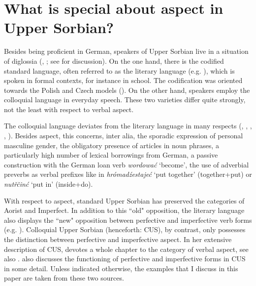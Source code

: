 \documentclass[output=paper,colorlinks,citecolor=brown]{langscibook}
\begin{document}
\section{What is special about aspect in Upper Sorbian?}\label{mueller:sec:cus}

Besides being proficient in German, speakers of Upper Sorbian live in a situation of diglossia (\citealt{Breu2000}, \citealt{Lewa2002}; see \citealt[39ff.]{Scholze2008} for discussion). On the one hand, there is the codified standard language, often referred to as the literary language (e.g. \citealt{Stone1993}), which is spoken in formal contexts, for instance in school. The codification was oriented towards the Polish and Czech models (\citealt[168]{Werner2003}).
On the other hand, speakers employ the colloquial language in everyday speech.
These two varieties differ quite strongly, not the least with respect to verbal aspect. 

The colloquial language deviates from the literary language in many respects (\citealt{Breu2000},
\citealt{Fasske1981}, \citealt{Lewa2002},
\citealt{Scholze2008}, \citealt{Stone1993}). Besides aspect, this 
concerns, inter alia, the sporadic expression of personal masculine gender, the obligatory presence of articles in noun phrases, a particularly 
high number of lexical borrowings from German, a passive construction with the German loan verb \textit{wordowa\'c} `become', the use of adverbial preverbs as verbal prefixes like in 
\textit{hr\'omad\'zestaje\'c} `put together' (together+put) or 
\textit{nutř\v{c}in\'c} `put in' (inside+do).

With respect to aspect, standard Upper Sorbian has preserved the categories of Aorist and Imperfect. In addition to this ``old" opposition, the literary language also displays the ``new" opposition between perfective and imperfective verb forms (e.g. \citealt{Fasske1981}). Colloquial Upper Sorbian (henceforth: CUS), by contrast, only possesses the distinction between perfective and imperfective aspect.  
In her extensive description of CUS, \citet{Scholze2008} devotes a whole chapter to the category of verbal aspect, see also \citet{Scholze23}. \citet{Breu2000} also discusses the functioning of perfective and imperfective forms in CUS in some detail. Unless indicated otherwise, the examples that I discuss in this paper are taken from these two sources.  
\end{document}
